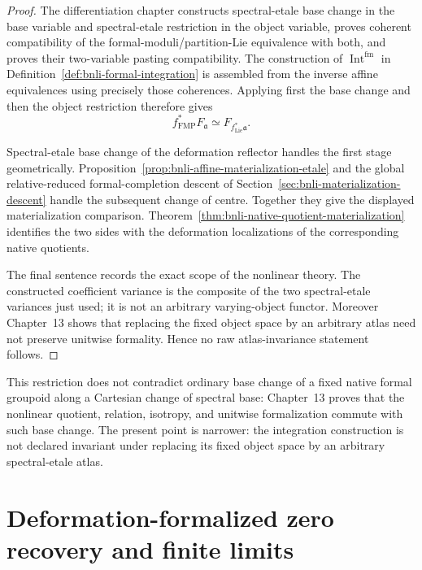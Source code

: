 \begin{proof}
The differentiation chapter constructs spectral-etale base change in the
base variable and spectral-etale restriction in the object variable, proves
coherent compatibility of the formal-moduli/partition-Lie equivalence with
both, and proves their two-variable pasting compatibility.  The construction
of $\operatorname{Int}^{\mathrm{fm}}$ in
Definition~\ref{def:bnli-formal-integration} is assembled from the inverse
affine equivalences using precisely those coherences.  Applying first the base
change and then the object restriction therefore gives
\[
    f_{\mathrm{FMP}}^*F_{\mathfrak a}
    \simeq
    F_{f_{\mathrm{Lie}}^*\mathfrak a}.
\]

Spectral-etale base change of the deformation reflector handles the first
stage geometrically.  Proposition~\ref{prop:bnli-affine-materialization-etale}
and the global relative-reduced formal-completion descent of
Section~\ref{sec:bnli-materialization-descent} handle the subsequent change of
centre.  Together they give the displayed materialization comparison.
Theorem~\ref{thm:bnli-native-quotient-materialization} identifies the two
sides with the deformation localizations of the corresponding native
quotients.

The final sentence records the exact scope of the nonlinear theory.  The
constructed coefficient variance is the composite of the two spectral-etale
variances just used; it is not an arbitrary varying-object functor.  Moreover
Chapter~13 shows that replacing the fixed object space by an arbitrary atlas
need not preserve unitwise formality.  Hence no raw atlas-invariance statement
follows.
\end{proof}

\begin{remark}
This restriction does not contradict ordinary base change of a fixed native
formal groupoid along a Cartesian change of spectral base: Chapter~13 proves
that the nonlinear quotient, relation, isotropy, and unitwise formalization
commute with such base change.  The present point is narrower: the integration
construction is not declared invariant under replacing its fixed object space
by an arbitrary spectral-etale atlas.
\end{remark}

\section{Deformation-formalized zero recovery and finite limits}
\label{sec:bnli-products}


